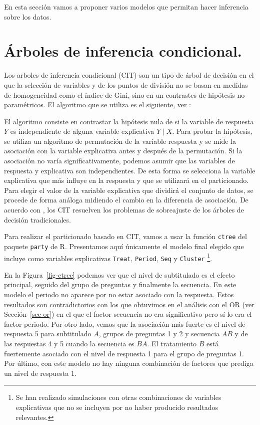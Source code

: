 \documentclass[
  12pt,
  a4paper,
  extrafontsizes,
  onecolumn,
  openright]{memoir}
\begin{document}
En esta sección vamos a proponer varios modelos que permitan hacer
inferencia sobre los datos.

\hypertarget{uxe1rboles-de-inferencia-condicional.}{%
\section{Árboles de inferencia
condicional.}\label{uxe1rboles-de-inferencia-condicional.}}

Los arboles de inferencia condicional (CIT) son un tipo de árbol de
decisión en el que la selección de variables y de los puntos de división
no se basan en medidas de homogeneidad como el índice de Gini, sino en
un contrastes de hipótesis no paramétricos. El algoritmo que se utiliza
es el siguiente, ver \textcite{Levshina2020}:

El algoritmo consiste en contrastar la hipótesis nula de si la variable
de respuesta \(Y\) es independiente de alguna variable explicativa
\(Y \mid X\). Para probar la hipótesis, se utiliza un algoritmo de
permutación de la variable respuesta y se mide la asociación con la
variable explicativa antes y después de la permutación. Si la asociación
no varía significativamente, podemos asumir que las variables de
respuesta y explicativa son independientes. De esta forma se selecciona
la variable explicativa que más influye en la respuesta y que se
utilizará en el particionado. Para elegir el valor de la variable
explicativa que dividirá el conjunto de datos, se procede de forma
análoga midiendo el cambio en la diferencia de asociación. De acuerdo
con \textcite{frienly2015-2}, los CIT resuelven los problemas de
sobreajuste de los árboles de decisión tradicionales.

Para realizar el particionado basado en CIT, vamos a usar la función
\texttt{ctree} del paquete \texttt{party} de R. Presentamos aquí
únicamente el modelo final elegido que incluye como variables
explicativas \texttt{Treat}, \texttt{Period}, \texttt{Seq} y
\texttt{Cluster} \footnote{Se han realizado simulaciones con otras
  combinaciones de variables explicativas que no se incluyen por no
  haber producido resultados relevantes.}.

En la Figura~\ref{fig-ctree} podemos ver que el nivel de subtitulado es
el efecto principal, seguido del grupo de preguntas y finalmente la
secuencia. En este modelo el periodo no aparece por no estar asociado
con la respuesta. Estos resultados son contradictorios con los que
obtuvimos en el análisis con el OR (ver Sección~\ref{sec-or}) en el que
el factor secuencia no era significativo pero sí lo era el factor
periodo. Por otro lado, vemos que la asociación más fuerte es el nivel
de respuesta 5 para subtitulado \(A\), grupos de preguntas 1 y 2 y
secuencia \(AB\) y de las respuestas 4 y 5 cuando la secuencia es
\(BA\). El tratamiento \(B\) está fuertemente asociado con el nivel de
respuesta 1 para el grupo de preguntas 1. Por último, con este modelo no
hay ninguna combinación de factores que prediga un nivel de respuesta 1.
\end{document}
